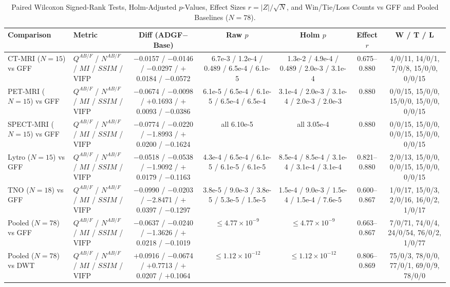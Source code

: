 \documentclass[conference]{IEEEtran}
\begin{document}
\begin{table}[htbp]
\caption{Paired Wilcoxon Signed-Rank Tests, Holm-Adjusted $p$-Values, Effect Sizes $r=|Z|/\sqrt{N}$, and Win/Tie/Loss Counts vs GFF and Pooled Baselines ($N=78$).}
\label{tab:wilcoxon}
\centering
\scriptsize
\begin{tabular}{llccccc}
\toprule
\textbf{Comparison} & \textbf{Metric} & \textbf{Diff (ADGF$-$Base)} & \textbf{Raw $p$} & \textbf{Holm $p$} & \textbf{Effect $r$} & \textbf{W / T / L} \\
\midrule
CT-MRI ($N=15$) vs GFF & $Q^{AB/F}$ / $N^{AB/F}$ / $MI$ / $SSIM$ / $\mathrm{VIFP}$ & $-$0.0157 / $-$0.0146 / $-$0.0297 / $+$0.0184 / $-$0.0572 & 6.7e-3 / 1.2e-4 / 0.489 / 6.5e-4 / 6.1e-5 & 1.3e-2 / 4.9e-4 / 0.489 / 2.0e-3 / 3.1e-4 & 0.675--0.880 & 4/0/11, 14/0/1, 7/0/8, 15/0/0, 0/0/15 \\
PET-MRI ($N=15$) vs GFF & $Q^{AB/F}$ / $N^{AB/F}$ / $MI$ / $SSIM$ / $\mathrm{VIFP}$ & $-$0.0674 / $-$0.0098 / $+$0.1693 / $+$0.0093 / $-$0.0386 & 6.1e-5 / 6.5e-4 / 6.1e-5 / 6.5e-4 / 6.5e-4 & 3.1e-4 / 2.0e-3 / 3.1e-4 / 2.0e-3 / 2.0e-3 & 0.880 & 0/0/15, 15/0/0, 15/0/0, 15/0/0, 0/0/15 \\
SPECT-MRI ($N=15$) vs GFF & $Q^{AB/F}$ / $N^{AB/F}$ / $MI$ / $SSIM$ / $\mathrm{VIFP}$ & $-$0.0774 / $-$0.0220 / $-$1.8993 / $+$0.0200 / $-$0.1624 & all 6.10e-5 & all 3.05e-4 & 0.880 & 0/0/15, 15/0/0, 0/0/15, 15/0/0, 0/0/15 \\
Lytro ($N=15$) vs GFF & $Q^{AB/F}$ / $N^{AB/F}$ / $MI$ / $SSIM$ / $\mathrm{VIFP}$ & $-$0.0518 / $-$0.0538 / $-$1.9092 / $+$0.0179 / $-$0.1163 & 4.3e-4 / 6.5e-4 / 6.1e-5 / 6.1e-5 / 6.1e-5 & 8.5e-4 / 8.5e-4 / 3.1e-4 / 3.1e-4 / 3.1e-4 & 0.821--0.880 & 2/0/13, 15/0/0, 0/0/15, 15/0/0, 0/0/15 \\
TNO ($N=18$) vs GFF & $Q^{AB/F}$ / $N^{AB/F}$ / $MI$ / $SSIM$ / $\mathrm{VIFP}$ & $-$0.0990 / $-$0.0203 / $-$2.8471 / $+$0.0397 / $-$0.1297 & 3.8e-5 / 9.0e-3 / 3.8e-5 / 5.3e-5 / 1.5e-5 & 1.5e-4 / 9.0e-3 / 1.5e-4 / 1.5e-4 / 7.6e-5 & 0.600--0.867 & 1/0/17, 15/0/3, 2/0/16, 16/0/2, 1/0/17 \\
\midrule
Pooled ($N=78$) vs GFF & $Q^{AB/F}$ / $N^{AB/F}$ / $MI$ / $SSIM$ / $\mathrm{VIFP}$ & $-$0.0637 / $-$0.0240 / $-$1.3626 / $+$0.0218 / $-$0.1019 & $\le 4.77\times 10^{-9}$ & $\le 4.77\times 10^{-9}$ & 0.663--0.867 & 7/0/71, 74/0/4, 24/0/54, 76/0/2, 1/0/77 \\
Pooled ($N=78$) vs DWT & $Q^{AB/F}$ / $N^{AB/F}$ / $MI$ / $SSIM$ / $\mathrm{VIFP}$ & $+$0.0916 / $-$0.0674 / $+$0.7713 / $+$0.0207 / $+$0.1064 & $\le 1.12\times 10^{-12}$ & $\le 1.12\times 10^{-12}$ & 0.806--0.869 & 75/0/3, 78/0/0, 77/0/1, 69/0/9, 78/0/0 \\

\end{tabular}
\end{table}
\end{document}
